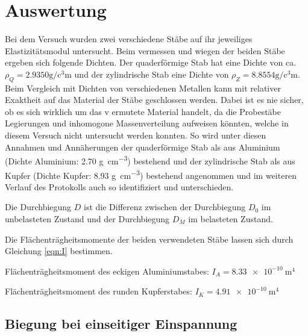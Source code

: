 \section{Auswertung}
\label{sec:Auswertung}

Bei dem Versuch wurden zwei verschiedene Stäbe auf ihr jeweiliges Elastizitätsmodul untersucht.
Beim vermessen und wiegen der beiden Stäbe ergeben sich folgende Dichten.
Der quaderförmige Stab hat eine Dichte von ca. $\rho_Q = 2.9350 \si{\gram\per\cubic\centi\meter}$
und der zylindrische Stab eine Dichte von $\rho_Z = 8.8554 \si{\gram\per\cubic\centi\meter}$.
Beim Vergleich mit Dichten von verschiedenen Metallen kann mit relativer Exaktheit auf das Material
der Stäbe geschlossen werden. Dabei ist es nie sicher, ob es sich wirklich um das v ermutete Material handelt, 
da die Probestäbe Legierungen und inhomogone Massenverteilung aufweisen könnten,
welche in diesem Versuch nicht untersucht werden konnten. So wird unter diesen Annahmen und Annäherungen der quaderförmige Stab als aus Aluminium (Dichte Aluminium: 2.70 \si{\gram\per\cubic\centi\meter}\cite{taschenbuch_physik}) bestehend und der zylindrische Stab als aus Kupfer (Dichte Kupfer: 8.93 \si{\gram\per\cubic\centi\meter}\cite{taschenbuch_physik}) bestehend angenommen und im weiteren Verlauf des Protokolls auch so identifiziert und unterschieden.



Die Durchbiegung $D$ ist die Differenz zwischen der Durchbiegung $D_0$ im unbelasteten Zustand und der
Durchbiegung $D_M$ im belasteten Zustand.

Die Flächenträgheitsmomente der beiden verwendeten Stäbe lassen sich durch Gleichung \eqref{eqn:I} bestimmen. 


Flächenträgheitsmoment des eckigen Aluminiumstabes: $I_A = \SI{8.33e-10}{\meter\tothe{4}}$


Flächenträgheitsmoment des runden Kupferstabes: $I_K = \SI{4.91e-10}{\meter\tothe{4}} $



\subsection{Biegung bei einseitiger Einspannung}



